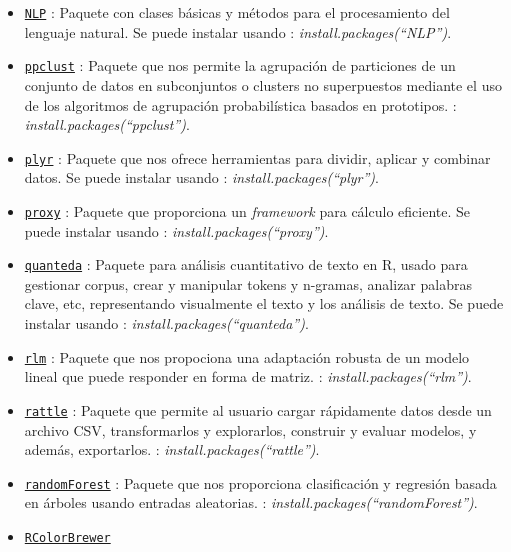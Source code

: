 \documentclass[spanish,]{article}
\begin{document}
\begin{itemize}
\item
  \href{https://cran.r-project.org/web/packages/NLP/NLP.pdf}{\texttt{NLP}}
  : Paquete con clases básicas y métodos para el procesamiento del
  lenguaje natural. Se puede instalar usando :
  \emph{install.packages(``NLP'')}.
\item
  \href{https://cran.r-project.org/web/packages/ppclust/ppclust.pdf}{\texttt{ppclust}}
  : Paquete que nos permite la agrupación de particiones de un conjunto
  de datos en subconjuntos o clusters no superpuestos mediante el uso de
  los algoritmos de agrupación probabilística basados en prototipos. :
  \emph{install.packages(``ppclust'')}.
\item
  \href{https://cran.r-project.org/web/packages/plyr/plyr.pdf}{\texttt{plyr}}
  : Paquete que nos ofrece herramientas para dividir, aplicar y combinar
  datos. Se puede instalar usando : \emph{install.packages(``plyr'')}.
\item
  \href{https://cran.r-project.org/web/packages/proxy/proxy.pdf}{\texttt{proxy}}
  : Paquete que proporciona un \emph{framework} para cálculo eficiente.
  Se puede instalar usando : \emph{install.packages(``proxy'')}.
\item
  \href{https://cran.r-project.org/web/packages/quanteda/quanteda.pdf}{\texttt{quanteda}}
  : Paquete para análisis cuantitativo de texto en R, usado para
  gestionar corpus, crear y manipular tokens y n-gramas, analizar
  palabras clave, etc, representando visualmente el texto y los análisis
  de texto. Se puede instalar usando :
  \emph{install.packages(``quanteda'')}.
\item
  \href{https://cran.r-project.org/web/packages/rlm/rlm.pdf}{\texttt{rlm}}
  : Paquete que nos propociona una adaptación robusta de un modelo
  lineal que puede responder en forma de matriz. :
  \emph{install.packages(``rlm'')}.
\item
  \href{https://cran.r-project.org/web/packages/rattle/rattle.pdf}{\texttt{rattle}}
  : Paquete que permite al usuario cargar rápidamente datos desde un
  archivo CSV, transformarlos y explorarlos, construir y evaluar
  modelos, y además, exportarlos. : \emph{install.packages(``rattle'')}.
\item
  \href{https://cran.r-project.org/web/packages/randomForest/randomForest.pdf}{\texttt{randomForest}}
  : Paquete que nos proporciona clasificación y regresión basada en
  árboles usando entradas aleatorias. :
  \emph{install.packages(``randomForest'')}.
\item
  \href{https://cran.r-project.org/web/packages/RColorBrewer/RColorBrewer.pdf}{\texttt{RColorBrewer}}

\end{itemize}
\end{document}
